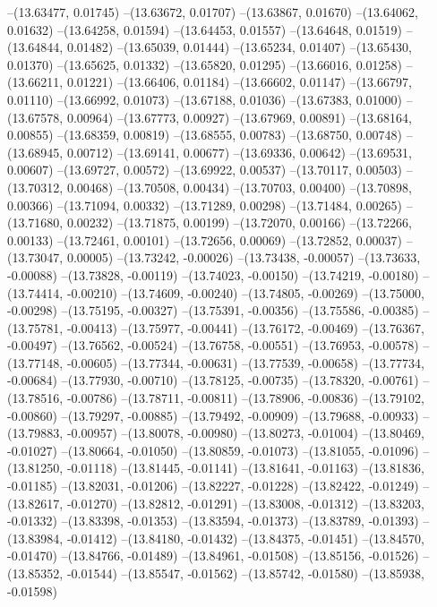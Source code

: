 --(13.63477, 0.01745)
--(13.63672, 0.01707)
--(13.63867, 0.01670)
--(13.64062, 0.01632)
--(13.64258, 0.01594)
--(13.64453, 0.01557)
--(13.64648, 0.01519)
--(13.64844, 0.01482)
--(13.65039, 0.01444)
--(13.65234, 0.01407)
--(13.65430, 0.01370)
--(13.65625, 0.01332)
--(13.65820, 0.01295)
--(13.66016, 0.01258)
--(13.66211, 0.01221)
--(13.66406, 0.01184)
--(13.66602, 0.01147)
--(13.66797, 0.01110)
--(13.66992, 0.01073)
--(13.67188, 0.01036)
--(13.67383, 0.01000)
--(13.67578, 0.00964)
--(13.67773, 0.00927)
--(13.67969, 0.00891)
--(13.68164, 0.00855)
--(13.68359, 0.00819)
--(13.68555, 0.00783)
--(13.68750, 0.00748)
--(13.68945, 0.00712)
--(13.69141, 0.00677)
--(13.69336, 0.00642)
--(13.69531, 0.00607)
--(13.69727, 0.00572)
--(13.69922, 0.00537)
--(13.70117, 0.00503)
--(13.70312, 0.00468)
--(13.70508, 0.00434)
--(13.70703, 0.00400)
--(13.70898, 0.00366)
--(13.71094, 0.00332)
--(13.71289, 0.00298)
--(13.71484, 0.00265)
--(13.71680, 0.00232)
--(13.71875, 0.00199)
--(13.72070, 0.00166)
--(13.72266, 0.00133)
--(13.72461, 0.00101)
--(13.72656, 0.00069)
--(13.72852, 0.00037)
--(13.73047, 0.00005)
--(13.73242, -0.00026)
--(13.73438, -0.00057)
--(13.73633, -0.00088)
--(13.73828, -0.00119)
--(13.74023, -0.00150)
--(13.74219, -0.00180)
--(13.74414, -0.00210)
--(13.74609, -0.00240)
--(13.74805, -0.00269)
--(13.75000, -0.00298)
--(13.75195, -0.00327)
--(13.75391, -0.00356)
--(13.75586, -0.00385)
--(13.75781, -0.00413)
--(13.75977, -0.00441)
--(13.76172, -0.00469)
--(13.76367, -0.00497)
--(13.76562, -0.00524)
--(13.76758, -0.00551)
--(13.76953, -0.00578)
--(13.77148, -0.00605)
--(13.77344, -0.00631)
--(13.77539, -0.00658)
--(13.77734, -0.00684)
--(13.77930, -0.00710)
--(13.78125, -0.00735)
--(13.78320, -0.00761)
--(13.78516, -0.00786)
--(13.78711, -0.00811)
--(13.78906, -0.00836)
--(13.79102, -0.00860)
--(13.79297, -0.00885)
--(13.79492, -0.00909)
--(13.79688, -0.00933)
--(13.79883, -0.00957)
--(13.80078, -0.00980)
--(13.80273, -0.01004)
--(13.80469, -0.01027)
--(13.80664, -0.01050)
--(13.80859, -0.01073)
--(13.81055, -0.01096)
--(13.81250, -0.01118)
--(13.81445, -0.01141)
--(13.81641, -0.01163)
--(13.81836, -0.01185)
--(13.82031, -0.01206)
--(13.82227, -0.01228)
--(13.82422, -0.01249)
--(13.82617, -0.01270)
--(13.82812, -0.01291)
--(13.83008, -0.01312)
--(13.83203, -0.01332)
--(13.83398, -0.01353)
--(13.83594, -0.01373)
--(13.83789, -0.01393)
--(13.83984, -0.01412)
--(13.84180, -0.01432)
--(13.84375, -0.01451)
--(13.84570, -0.01470)
--(13.84766, -0.01489)
--(13.84961, -0.01508)
--(13.85156, -0.01526)
--(13.85352, -0.01544)
--(13.85547, -0.01562)
--(13.85742, -0.01580)
--(13.85938, -0.01598)
